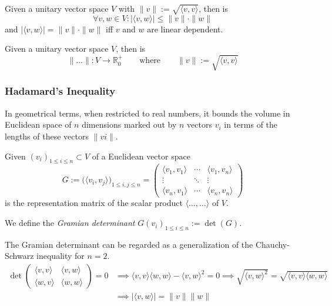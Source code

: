 \begin{proposition}
   Given a unitary vector space \(V\) with \(\|v\| := \sqrt{\langle v, v\rangle}\), then is
   \[\forall v, w \in V: |\langle v, w\rangle| \leq \|v\| \cdot \|w\|\]
   and \(|\langle v, w\rangle| = \|v\| \cdot \|w\|\) iff \(v\) and \(w\) are linear dependent.
\end{proposition}

\begin{corollary}
   Given a unitary vector space \(V\), then is
   \[\|\ldots\|: V \to \mathbb{R}_0^+ \qquad\text{where}\qquad \|v\| := \sqrt{\langle v, v\rangle}\]
\end{corollary}

\subsubsection{Hadamard's Inequality}
In geometrical terms, when restricted to real numbers, it bounds the volume in Euclidean space of \(n\) dimensions marked out by \(n\) vectors \(v_i\) in terms of the lengths of these vectors \(\|vi\|\).
\begin{definition}
   Given \((v_i)_{1 \leq i \leq n} \subset V\) of a Euclidean vector space
   \[G := \big(\langle v_i, v_j\rangle\big)_{1 \leq i,j \leq n} = \begin{pmatrix} \langle v_1, v_1 \rangle & \cdots & \langle v_1, v_n\rangle\\ \vdots & \ddots & \vdots\\\langle v_n, v_1\rangle & \cdots & \langle v_n, v_n \rangle\end{pmatrix}\]
   is the representation matrix of the scalar product \(\langle \ldots, \ldots \rangle\) of \(V\).

   We define the \emph{Gramian determinant} \(G(v_i)_{1 \leq i \leq n} := \det(G)\).
\end{definition}
\begin{remark}
   The Gramian determinant can be regarded as a generalization of the Chauchy-Schwarz inequality for \(n = 2\).
   \begin{equation*}
      \begin{split}
         \det\begin{pmatrix}\langle v, v\rangle & \langle v, w\rangle\\\langle w, v \rangle & \langle w, w\rangle\end{pmatrix} = 0 & \implies \langle v, v \rangle\langle w, w\rangle - \langle v, w\rangle^2 = 0 \implies \sqrt{\langle v, w \rangle^2} = \sqrt{\langle v, v\rangle \langle w, w\rangle}\\
         & \implies |\langle v, w\rangle| = \|v\| \|w\|
      \end{split}
   \end{equation*}
\end{remark}


